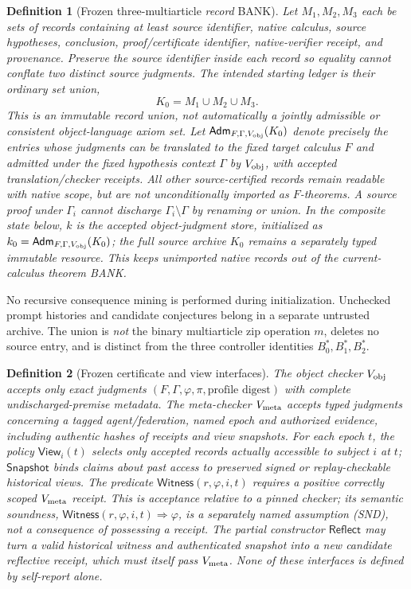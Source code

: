 \documentclass[10pt,letterpaper]{article}
\newtheorem{definition}{Definition}[section]
\theoremstyle{remark}\newtheorem{remark}[definition]{Remark}
\begin{document}
\begin{definition}[Frozen three-multiarticle \emph{record} BANK]
Let $M_1,M_2,M_3$ each be sets of records containing at least source identifier, native calculus, source hypotheses, conclusion, proof/certificate identifier, native-verifier receipt, and provenance. Preserve the source identifier \emph{inside each record} so equality cannot conflate two distinct source judgments. The intended starting ledger is their ordinary set union,
\[
\boxed{K_0=M_1\cup M_2\cup M_3.}
\]
This is an immutable \emph{record union}, not automatically a jointly admissible or consistent object-language axiom set. Let $\mathsf{Adm}_{F,\Gamma,V_{\rm obj}}(K_0)$ denote precisely the entries whose judgments can be translated to the fixed target calculus $F$ and admitted under the fixed hypothesis context $\Gamma$ by $V_{\rm obj}$, with accepted translation/checker receipts. All other source-certified records remain readable with native scope, but are \emph{not} unconditionally imported as $F$-theorems. A source proof under $\Gamma_i$ cannot discharge $\Gamma_i\setminus\Gamma$ by renaming or union. In the composite state below, $k$ is the \emph{accepted object-judgment store}, initialized as $k_0=\mathsf{Adm}_{F,\Gamma,V_{\rm obj}}(K_0)$; the full source archive $K_0$ remains a separately typed immutable resource. This keeps unimported native records out of the current-calculus theorem BANK.
\end{definition}

No recursive consequence mining is performed during initialization. Unchecked prompt histories and candidate conjectures belong in a separate untrusted archive. The union is \emph{not} the binary multiarticle zip operation $m$, deletes no source entry, and is distinct from the three controller identities $B^*_0,B^*_1,B^*_2$.

\begin{definition}[Frozen certificate and view interfaces]
The object checker $V_{\rm obj}$ accepts only exact judgments $(F,\Gamma,\varphi,\pi,\text{profile digest})$ with complete undischarged-premise metadata. The meta-checker $V_{\rm meta}$ accepts typed judgments concerning a tagged agent/federation, named epoch and authorized evidence, including authentic hashes of receipts and view snapshots. For each epoch $t$, the policy $\mathsf{View}_{i}(t)$ selects only accepted records actually accessible to subject $i$ at $t$; $\mathsf{Snapshot}$ binds claims about past access to preserved signed or replay-checkable historical views. The predicate $\mathsf{Witness}(r,\varphi,i,t)$ requires a positive correctly scoped $V_{\rm meta}$ receipt. This is \emph{acceptance relative to a pinned checker}; its semantic soundness, $\mathsf{Witness}(r,\varphi,i,t)\Rightarrow\varphi$, is a separately named assumption (SND), not a consequence of possessing a receipt. The partial constructor $\mathsf{Reflect}$ may turn a valid historical witness and authenticated snapshot into a \emph{new candidate} reflective receipt, which must itself pass $V_{\rm meta}$. None of these interfaces is defined by self-report alone.
\end{definition}
\end{document}
